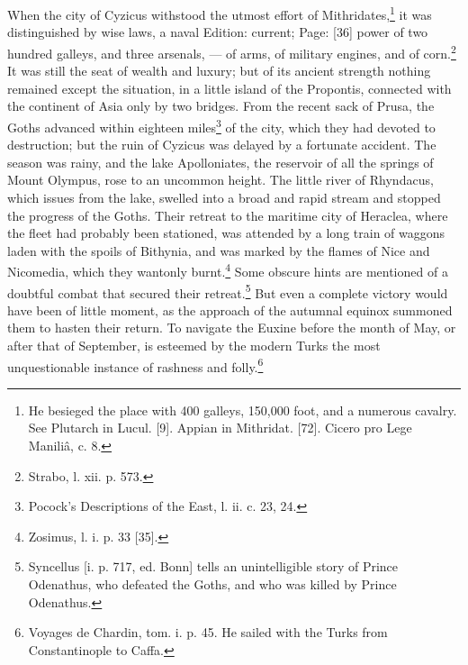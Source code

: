 When the city of Cyzicus withstood the utmost effort of Mithridates,\footnote{He besieged the place with 400 galleys, 150,000 foot, and a numerous cavalry. See Plutarch in Lucul. [9]. Appian in Mithridat. [72]. Cicero pro Lege Maniliâ, c. 8.} it was distinguished by wise laws, a naval Edition: current; Page: [36] power of two hundred galleys, and three arsenals, \texthebrew{—} of arms, of military engines, and of corn.\footnote{Strabo, l. xii. p. 573.} It was still the seat of wealth and luxury; but of its ancient strength nothing remained except the situation, in a little island of the Propontis, connected with the continent of Asia only by two bridges. From the recent sack of Prusa, the Goths advanced within eighteen miles\footnote{Pocock\texthebrew{}’s Descriptions of the East, l. ii. c. 23, 24.} of the city, which they had devoted to destruction; but the ruin of Cyzicus was delayed by a fortunate accident. The season was rainy, and the lake Apolloniates, the reservoir of all the springs of Mount Olympus, rose to an uncommon height. The little river of Rhyndacus, which issues from the lake, swelled into a broad and rapid stream and stopped the progress of the Goths. Their retreat to the maritime city of Heraclea, where the fleet had probably been stationed, was attended by a long train of waggons laden with the spoils of Bithynia, and was marked by the flames of Nice and Nicomedia, which they wantonly burnt.\footnote{Zosimus, l. i. p. 33 [35].} Some obscure hints are mentioned of a doubtful combat that secured their retreat.\footnote{Syncellus [i. p. 717, ed. Bonn] tells an unintelligible story of Prince Odenathus, who defeated the Goths, and who was killed by Prince Odenathus.} But even a complete victory would have been of little moment, as the approach of the autumnal equinox summoned them to hasten their return. To navigate the Euxine before the month of May, or after that of September, is esteemed by the modern Turks the most unquestionable instance of rashness and folly.\footnote{Voyages de Chardin, tom. i. p. 45. He sailed with the Turks from Constantinople to Caffa.}

